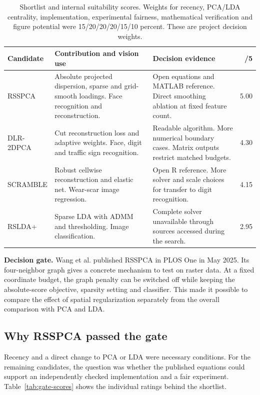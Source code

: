\documentclass[11pt,a4paper]{article}
\begin{document}
\begin{table}[H]\small
\caption{Shortlist and internal suitability scores. Weights for recency, PCA/LDA centrality, implementation, experimental fairness, mathematical verification and figure potential were 15/20/20/20/15/10 percent. These are project decision weights.}
\begin{tabularx}{\linewidth}{@{}P{26mm}YP{56mm}r@{}}
\toprule
Candidate & Contribution and vision use & Decision evidence & /5\\
\midrule
RSSPCA \citep{wang2025} & Absolute projected dispersion, sparse and grid-smooth loadings. Face recognition and reconstruction. & Open equations and MATLAB reference. Direct smoothing ablation at fixed feature count. & 5.00\\
DLR-2DPCA \citep{bi2025} & Cut reconstruction loss and adaptive weights. Face, digit and traffic sign recognition. & Readable algorithm. More numerical boundary cases. Matrix outputs restrict matched budgets. & 4.30\\
SCRAMBLE \citep{pfeiffer2025} & Robust cellwise reconstruction and elastic net. Wear-scar image regression. & Open R reference. More solver and scale choices for transfer to digit recognition. & 4.15\\
RSLDA+ \citep{liu2024} & Sparse LDA with ADMM and thresholding. Image classification. & Complete solver unavailable through sources accessed during the search. & 2.95\\
\bottomrule
\end{tabularx}
\end{table}
\textbf{Decision gate.}
Wang et al. published RSSPCA in PLOS One in May 2025. Its four-neighbor graph gives a concrete mechanism to test on raster data. At a fixed coordinate budget, the graph penalty can be switched off while keeping the absolute-score objective, sparsity setting and classifier. This made it possible to compare the effect of spatial regularization separately from the overall comparison with PCA and LDA.

\clearpage
\subsection{Why RSSPCA passed the gate}

Recency and a direct change to PCA or LDA were necessary conditions. For the remaining candidates, the question was whether the published equations could support an independently checked implementation and a fair experiment. Table~\ref{tab:gate-scores} shows the individual ratings behind the shortlist.
\end{document}

